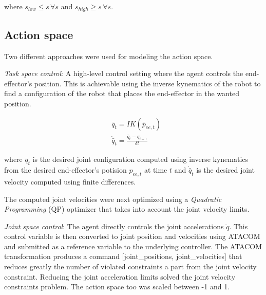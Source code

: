 where $s_{low} \le s \,\forall s$ and $s_{high} \ge s\,\forall s$.


\subsection{Action space}
\label{subseq:action_space}
Two different approaches were used for modeling the action space.

\textit{Task space control}:
A high-level control setting where the agent controls the end-effector's position. This is achievable using the inverse kynematics of the robot
to find a configuration of the robot that places the end-effector in the wanted position.

\begin{equation*}
    \begin{aligned}
        &\bar{q}_t = IK(\bar{p}_{ee,t}) \\
        &\dot{\bar{q}}_t = \frac{\bar{q}_t - q_{t-1}}{\delta t}
    \end{aligned}
\end{equation*}

where $\bar{q}_t$ is the desired joint configuration computed using inverse kynematics from the desired end-effector's potision $p_{ee,t}$ at time $t$ and
$\dot{\bar{q}}_t$ is the desired joint velocity computed using finite differences.

The computed joint velocities were next optimized using a \textit{Quadratic Programming} (QP) optimizer that takes into account the joint velocity limits.

\textit{Joint space control}:
The agent directly controls the joint accelerations $\ddot{q}$. This control variable is then converted to joint position and velocities using ATACOM \cite{Atacom} and submitted as a reference variable
to the underlying controller. The ATACOM transformation produces a command [joint\_positions, joint\_velocities] that reduces greatly the number of violated constraints a part from the joint velocity constraint.
Reducing the joint acceleration limits solved the joint velocity constraints problem. The action space too was scaled between -1 and 1.


